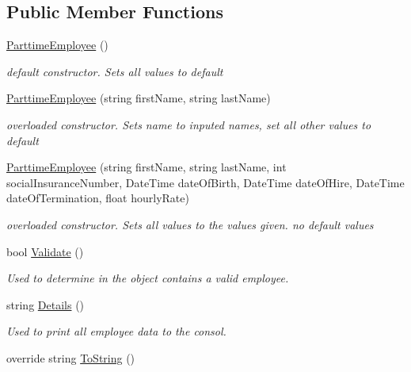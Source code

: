\subsection*{Public Member Functions}
\begin{DoxyCompactItemize}
\item 
\hyperlink{class_all_employees_1_1_parttime_employee_aefdb20ed1cc9fb007068380a97e3f51e}{Parttime\+Employee} ()
\begin{DoxyCompactList}\small\item\em default constructor. Sets all values to default \end{DoxyCompactList}\item 
\hyperlink{class_all_employees_1_1_parttime_employee_a9c867461dd13baee1e84702999817ffb}{Parttime\+Employee} (string first\+Name, string last\+Name)
\begin{DoxyCompactList}\small\item\em overloaded constructor. Sets name to inputed names, set all other values to default \end{DoxyCompactList}\item 
\hyperlink{class_all_employees_1_1_parttime_employee_a4e465df9dcdecf0ba7eb89eae52d3f3a}{Parttime\+Employee} (string first\+Name, string last\+Name, int social\+Insurance\+Number, Date\+Time date\+Of\+Birth, Date\+Time date\+Of\+Hire, Date\+Time date\+Of\+Termination, float hourly\+Rate)
\begin{DoxyCompactList}\small\item\em overloaded constructor. Sets all values to the values given. no default values \end{DoxyCompactList}\item 
bool \hyperlink{class_all_employees_1_1_parttime_employee_ae9dfe4fa4f371c46c853cb499da663e7}{Validate} ()
\begin{DoxyCompactList}\small\item\em Used to determine in the object contains a valid employee. \end{DoxyCompactList}\item 
string \hyperlink{class_all_employees_1_1_parttime_employee_aab5cb221e05fda2cbac3d3ecb1398595}{Details} ()
\begin{DoxyCompactList}\small\item\em Used to print all employee data to the consol. \end{DoxyCompactList}\item 
override string \hyperlink{class_all_employees_1_1_parttime_employee_ab24493d33b967822f501bd92996a9e21}{To\+String} ()

\end{DoxyCompactItemize}
